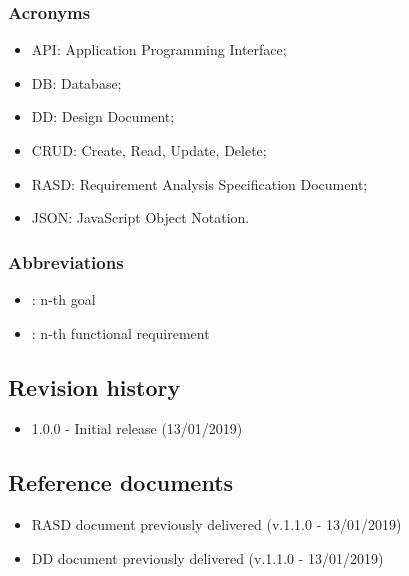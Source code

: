 \documentclass{article}
\begin{document}
\subsubsection{Acronyms}
\begin{itemize}
	\item API: Application Programming Interface;
	\item DB: Database;
	\item DD: Design Document;
	\item CRUD: Create, Read, Update, Delete;
	\item RASD: Requirement Analysis Specification Document;
	\item JSON: JavaScript Object Notation.
\end{itemize}

\subsubsection{Abbreviations}
\begin{itemize}
	\item \begin{math}[Gn]\end{math}: n-th goal
	\item \begin{math}[Rn]\end{math}: n-th functional requirement
\end{itemize}

\subsection{Revision history}
\begin{itemize}
	\item 1.0.0 - Initial release (13/01/2019)
\end{itemize}

\subsection{Reference documents}
\begin{itemize}
	\item RASD document previously delivered (v.1.1.0 - 13/01/2019)
	\item DD document previously delivered (v.1.1.0 - 13/01/2019)
\end{itemize}

\newpage
\end{document}
